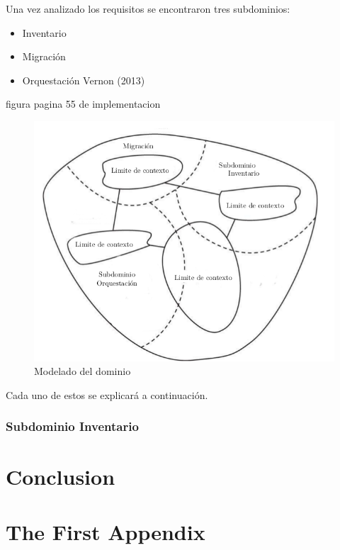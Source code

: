 \documentclass[12pt,twoside]{reedthesis}
\providecommand{\tightlist}{%
  \setlength{\itemsep}{0pt}\setlength{\parskip}{0pt}}
\begin{document}
Una vez analizado los requisitos se encontraron tres subdominios:
\begin{itemize}
\tightlist
\item
  Inventario
\item
  Migración
\item
  Orquestación Vernon (2013)
\end{itemize}
figura pagina 55 de implementacion
\begin{figure}[h!]
  \centering
  \includegraphics[scale=0.5]{./figure/Cap4/plantillaDDD.png}
  \caption{Modelado del dominio}\label{DDDplantilla}
\end{figure}
Cada uno de estos se explicará a continuación.

\hypertarget{subdominio-inventario}{%
\subsection{Subdominio Inventario}\label{subdominio-inventario}}

\hypertarget{conclusion}{%
\chapter*{Conclusion}\label{conclusion}}

\appendix

\hypertarget{the-first-appendix}{%
\chapter{The First Appendix}\label{the-first-appendix}}
\end{document}
